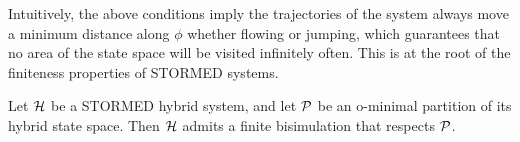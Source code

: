 Intuitively, the above conditions imply the trajectories of the system always move a minimum distance along $\phi$ whether flowing or jumping, which guarantees that no area of the state space will be visited infinitely often. 
This is at the root of the finiteness properties of STORMED systems.
\begin{thm}\cite{VladimerouPVD08_STORMED}
	\label{thm:stormed finite bisimu}	
	Let $\mathcal{H}$ be a STORMED hybrid system, and let $\mathcal{P}$ be an o-minimal partition of its hybrid state space. 
	Then $\mathcal{H}$ admits a finite bisimulation that respects $\mathcal{P}$.
\end{thm}

